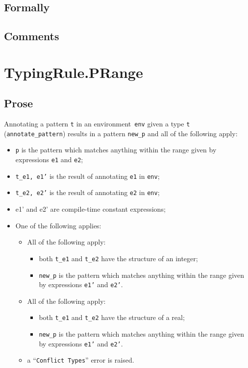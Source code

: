 \documentclass{book}
\begin{document}
  \subsection{Formally}

  \subsection{Comments}
 
\section{TypingRule.PRange \label{sec:TypingRule.PRange}}

    \subsection{Prose}
   Annotating a pattern \texttt{t} in an environment~\texttt{env} given a type \texttt{t} (\texttt{annotate\_pattern}) results in a pattern \texttt{new\_p} and all of the following apply:
   \begin{itemize}
   \item \texttt{p} is the pattern which matches anything within the range given by
      expressions \texttt{e1} and \texttt{e2};
   \item \texttt{t\_e1, e1'} is the result of annotating \texttt{e1} in \texttt{env};
   \item \texttt{t\_e2, e2'} is the result of annotating \texttt{e2} in \texttt{env};
   \item e1' and e2' are compile-time constant expressions; 
   \item One of the following applies:
     \begin{itemize}
     \item All of the following apply:
           \begin{itemize}
           \item both \texttt{t\_e1} and \texttt{t\_e2} have the structure of an integer;
           \item \texttt{new\_p} is the pattern which matches anything within the range given by
      expressions \texttt{e1'} and \texttt{e2'}.
           \end{itemize}
     \item All of the following apply:
           \begin{itemize}
           \item both \texttt{t\_e1} and \texttt{t\_e2} have the structure of a real;
           \item \texttt{new\_p} is the pattern which matches anything within the range given by
      expressions \texttt{e1'} and \texttt{e2'}.
           \end{itemize}
     \item a ``\texttt{Conflict Types}'' error is raised.
     \end{itemize}
   \end{itemize}
\end{document}
